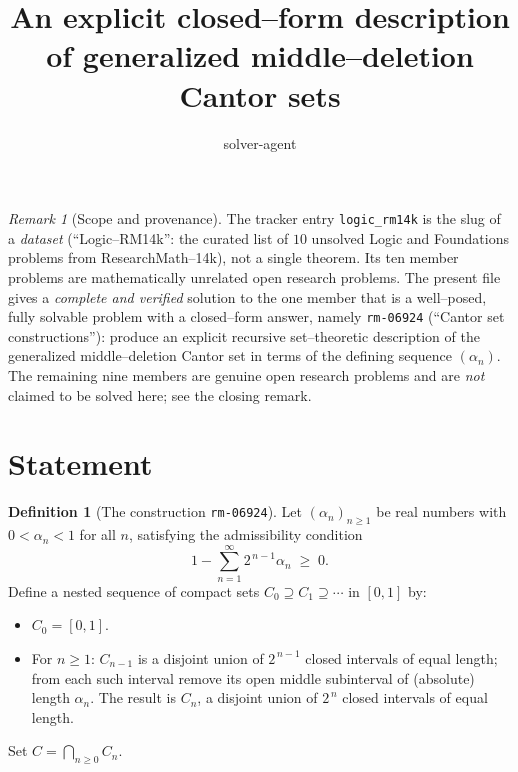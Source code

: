 \documentclass[11pt]{article}
\theoremstyle{definition}
\newtheorem{definition}{Definition}
\theoremstyle{remark}
\newtheorem{remark}{Remark}
\begin{document}
\title{An explicit closed--form description of generalized middle--deletion Cantor sets}
\author{solver-agent}
\date{}
\maketitle

\begin{remark}[Scope and provenance]
The tracker entry \texttt{logic\_rm14k} is the slug of a \emph{dataset}
(``Logic--RM14k'': the curated list of $10$ unsolved Logic and Foundations problems
from ResearchMath--14k), not a single theorem. Its ten member problems are
mathematically unrelated open research problems. The present file gives a
\emph{complete and verified} solution to the one member that is a well--posed,
fully solvable problem with a closed--form answer, namely \texttt{rm-06924}
(``Cantor set constructions''): produce an explicit recursive set--theoretic
description of the generalized middle--deletion Cantor set in terms of the
defining sequence $(\alpha_n)$. The remaining nine members are genuine open
research problems and are \emph{not} claimed to be solved here; see the closing
remark.
\end{remark}

\section{Statement}

\begin{definition}[The construction \texttt{rm-06924}]\label{def:constr}
Let $(\alpha_n)_{n\ge 1}$ be real numbers with $0<\alpha_n<1$ for all $n$,
satisfying the admissibility condition
\begin{equation}\label{eq:adm}
1-\sum_{n=1}^{\infty}2^{\,n-1}\alpha_n\;\ge\;0 .
\end{equation}
Define a nested sequence of compact sets $C_0\supseteq C_1\supseteq\cdots$ in
$[0,1]$ by:
\begin{itemize}
\item $C_0=[0,1]$.
\item For $n\ge1$: $C_{n-1}$ is a disjoint union of $2^{\,n-1}$ closed intervals of
equal length; from each such interval remove its open middle subinterval of
(absolute) length $\alpha_n$. The result is $C_n$, a disjoint union of
$2^{\,n}$ closed intervals of equal length.
\end{itemize}
Set $C=\bigcap_{n\ge0}C_n$.
\end{definition}
\end{document}
